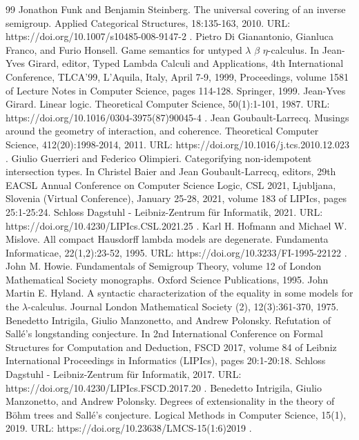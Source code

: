 \documentclass[10pt,a4paper]{amsart}
\begin{document}
\begin{thebibliography}{99}
 Jonathon Funk and Benjamin Steinberg. The universal covering of an inverse semigroup. Applied Categorical Structures, 18:135-163, 2010. URL: https://doi.org/10.1007/s10485-008-9147-2 .
 Pietro Di Gianantonio, Gianluca Franco, and Furio Honsell. Game semantics for untyped \ensuremath{\lambda} \ensuremath{\beta} \ensuremath{\eta}-calculus. In Jean-Yves Girard, editor, Typed Lambda Calculi and Applications, 4th International Conference, TLCA'99, L'Aquila, Italy, April 7-9, 1999, Proceedings, volume 1581 of Lecture Notes in Computer Science, pages 114-128. Springer, 1999.
 Jean-Yves Girard. Linear logic. Theoretical Computer Science, 50(1):1-101, 1987. URL: https://doi.org/10.1016/0304-3975(87)90045-4 .
 Jean Goubault-Larrecq. Musings around the geometry of interaction, and coherence. Theoretical Computer Science, 412(20):1998-2014, 2011. URL: https://doi.org/10.1016/j.tcs.2010.12.023 .
 Giulio Guerrieri and Federico Olimpieri. Categorifying non-idempotent intersection types. In Christel Baier and Jean Goubault-Larrecq, editors, 29th EACSL Annual Conference on Computer Science Logic, CSL 2021, Ljubljana, Slovenia (Virtual Conference), January 25-28, 2021, volume 183 of LIPIcs, pages 25:1-25:24. Schloss Dagstuhl - Leibniz-Zentrum für Informatik, 2021. URL: https://doi.org/10.4230/LIPIcs.CSL.2021.25 .
 Karl H. Hofmann and Michael W. Mislove. All compact Hausdorff lambda models are degenerate. Fundamenta Informaticae, 22(1,2):23-52, 1995. URL: https://doi.org/10.3233/FI-1995-22122 .
 John M. Howie. Fundamentals of Semigroup Theory, volume 12 of London Mathematical Society monographs. Oxford Science Publications, 1995.
 John Martin E. Hyland. A syntactic characterization of the equality in some models for the \ensuremath{\lambda}-calculus. Journal London Mathematical Society (2), 12(3):361-370, 1975.
 Benedetto Intrigila, Giulio Manzonetto, and Andrew Polonsky. Refutation of Sallé’s longstanding conjecture. In 2nd International Conference on Formal Structures for Computation and Deduction, FSCD 2017, volume 84 of Leibniz International Proceedings in Informatics (LIPIcs), pages 20:1-20:18. Schloss Dagstuhl - Leibniz-Zentrum für Informatik, 2017. URL: https://doi.org/10.4230/LIPIcs.FSCD.2017.20 .
 Benedetto Intrigila, Giulio Manzonetto, and Andrew Polonsky. Degrees of extensionality in the theory of Böhm trees and Sallé’s conjecture. Logical Methods in Computer Science, 15(1), 2019. URL: https://doi.org/10.23638/LMCS-15(1:6)2019 .

\end{thebibliography}
\end{document}
